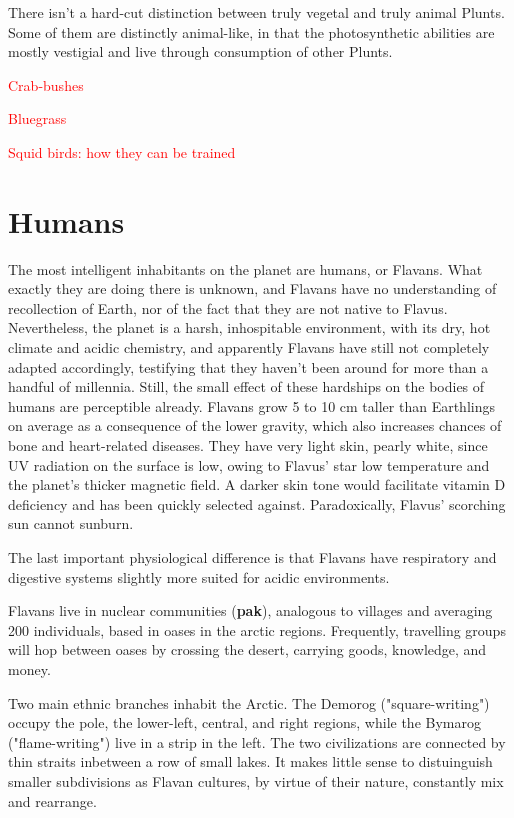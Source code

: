 \documentclass[10pt,oneside]{memoir}
\newcommand{\cmmnt}[1]{\textcolor{red}{#1}}
\begin{document}
There isn't a hard-cut distinction between truly vegetal and truly animal Plunts. Some of them are distinctly animal-like, in that the photosynthetic abilities are mostly vestigial and live through consumption of other Plunts.

\cmmnt{Crab-bushes}

\cmmnt{Bluegrass}

\cmmnt{Squid birds: how they can be trained}


\pagebreak

\section{Humans}

The most intelligent inhabitants on the planet are humans, or Flavans. What exactly they are doing there is unknown, and Flavans have no understanding of recollection of Earth, nor of the fact that they are not native to Flavus. Nevertheless, the planet is a harsh, inhospitable environment, with its dry, hot climate and acidic chemistry, and apparently Flavans have still not completely adapted accordingly, testifying that they haven't been around for more than a handful of millennia. Still, the small effect of these hardships on the bodies of humans are perceptible already. Flavans grow 5 to 10 cm taller than Earthlings on average as a consequence of the lower gravity, which also increases chances of bone and heart-related diseases. They have very light skin, pearly white, since UV radiation on the surface is low, owing to Flavus' star low temperature and the planet's thicker magnetic field. A darker skin tone would facilitate vitamin D deficiency and has been quickly selected against. Paradoxically, Flavus' scorching sun cannot sunburn.

The last important physiological difference is that Flavans have respiratory and digestive systems slightly more suited for acidic environments. 

Flavans live in nuclear communities (\textbf{pak}), analogous to villages and averaging 200 individuals, based in oases in the arctic regions. Frequently, travelling groups will hop between oases by crossing the desert, carrying goods, knowledge, and money.

Two main ethnic branches inhabit the Arctic. The Demorog ("square-writing") occupy the pole, the lower-left, central, and right regions, while the Bymarog ("flame-writing") live in a strip in the left. The two civilizations are connected by thin straits inbetween a row of small lakes. It makes little sense to distuinguish smaller subdivisions as Flavan cultures, by virtue of their nature, constantly mix and rearrange.
\end{document}
